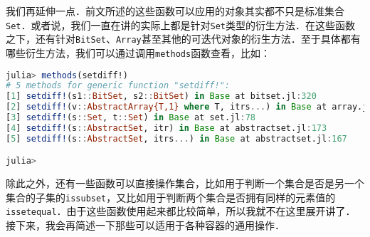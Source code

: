 我们再延伸一点．前文所述的这些函数可以应用的对象其实都不只是标准集合\verb|Set|．或者说，我们一直在讲的实际上都是针对\verb|Set|类型的衍生方法．在这些函数之下，还有针对\verb|BitSet|、\verb|Array|甚至其他的可迭代对象的衍生方法．至于具体都有哪些衍生方法，我们可以通过调用\verb|methods|函数查看，比如：

\begin{lstlisting}[language=julia]
julia> methods(setdiff!)
# 5 methods for generic function "setdiff!":
[1] setdiff!(s1::BitSet, s2::BitSet) in Base at bitset.jl:320
[2] setdiff!(v::AbstractArray{T,1} where T, itrs...) in Base at array.jl:2440
[3] setdiff!(s::Set, t::Set) in Base at set.jl:78
[4] setdiff!(s::AbstractSet, itr) in Base at abstractset.jl:173
[5] setdiff!(s::AbstractSet, itrs...) in Base at abstractset.jl:167

julia> 
\end{lstlisting}

除此之外，还有一些函数可以直接操作集合，比如用于判断一个集合是否是另一个集合的子集的\verb|issubset|，又比如用于判断两个集合是否拥有同样的元素值的\verb|issetequal|．由于这些函数使用起来都比较简单，所以我就不在这里展开讲了．接下来，我会再简述一下那些可以适用于各种容器的通用操作．